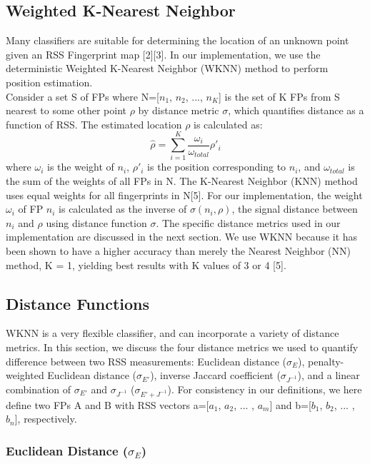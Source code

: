 \documentclass[conference]{IEEEtran}
\begin{document}
\subsection{Weighted K-Nearest Neighbor}
Many classifiers are suitable for determining the location of an unknown point given an RSS Fingerprint map [2][3]. In our implementation, we use the deterministic Weighted K-Nearest Neighbor (WKNN) method to perform position estimation.\\
\indent Consider a set S of FPs  where N=[$n_1$, $n_2$, ..., $n_K$] is the set of K FPs from S nearest to some other point $\rho$ by distance metric $\sigma$, which quantifies distance as a function of RSS. The estimated location $\rho$ is calculated as:
\begin{equation}
\label{wknn}
\hat{\rho} = \sum\limits_{i=1}^{K}\frac{\omega_i}{\omega_{total}}\rho'_i
\end{equation}
\indent where $\omega_i$ is the weight of $n_i$, $\rho'_i$ is the position corresponding to $n_i$, and $\omega_{total}$ is the sum of the weights of all FPs in N. The K-Nearest Neighbor (KNN) method uses equal weights for all fingerprints in N[5]. For our implementation, the weight $\omega_i$ of FP $n_i$ is calculated as the inverse of $\sigma(n_i, \rho)$, the signal distance between $n_i$ and $\rho$ using distance function $\sigma$. The specific distance metrics used in our implementation are discussed in the next section. We use WKNN because it has been shown to have a higher accuracy than merely the Nearest Neighbor (NN) method, K = 1, yielding best results with K values of 3 or 4 [5]. 

\subsection{Distance Functions}
WKNN is a very flexible classifier, and can incorporate a variety of distance metrics. In this section, we discuss the four distance metrics we used to quantify difference between two RSS measurements: Euclidean distance ($\sigma_E$), penalty-weighted Euclidean distance ($\sigma_{E'}$), inverse Jaccard coefficient ($\sigma_{J^{-1}}$), and a linear combination of $\sigma_{E'}$ and $\sigma_{J^{-1}}$ ($\sigma_{E' + J^{-1}}$). For consistency in our definitions, we here define two FPs A and B with RSS vectors a=[$a_1$, $a_2$, ... , $a_m$] and b=[$b_1$, $b_2$, ... , $b_n$], respectively. 

\subsubsection{Euclidean Distance ($\sigma_E$)}
\end{document}
